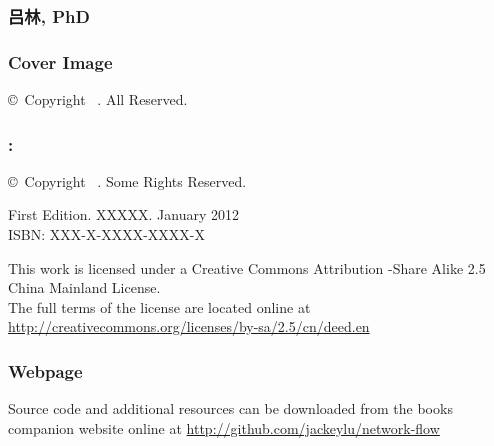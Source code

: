 

\vspace*{\fill}
\begin{flushleft}
\begin{small}

\subsubsection*{吕林, PhD}

\subsubsection*{Cover Image}
\copyright\ Copyright \mybookdate\ \mybookauthor. All Reserved. \\
\vspace{0.5cm}

\subsubsection*{\mybooktitle: \mybooksubtitle}
\copyright\ Copyright \mybookdate\ \mybookauthor. Some Rights Reserved. \\
\vspace{0.5cm}

First Edition. XXXXX. January 2012 \\
ISBN: XXX-X-XXXX-XXXX-X \\
\vspace{0.5cm}

This work is licensed under a Creative Commons Attribution \--Share Alike 2.5 China Mainland License. \\
The full terms of the license are located online at \url{http://creativecommons.org/licenses/by-sa/2.5/cn/deed.en} \\
\vspace{0.5cm}

\subsubsection*{Webpage}
Source code and additional resources can be downloaded from the books companion website online at \url{http://github.com/jackeylu/network-flow}

\end{small}
\end{flushleft}

